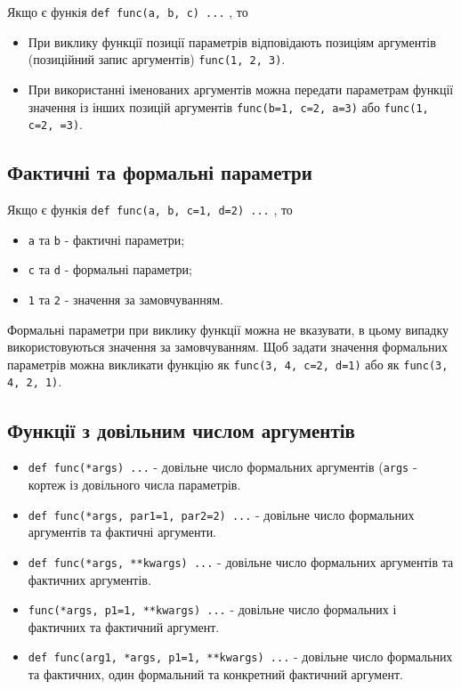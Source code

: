 \begin{frame}
Якщо є функія \texttt{def func(a, b, c) ...} , то

\begin{itemize}
  \item При виклику функції позиції параметрів відповідають позиціям аргументів (позиційний запис аргументів) \texttt{func(1, 2, 3)}.
  \item При використанні іменованих аргументів можна передати параметрам функції значення із інших позицій аргументів \texttt{func(b=1, c=2, a=3)} або \texttt{func(1, c=2, =3)}.
\end{itemize}

\end{frame}

\subsection{Фактичні та формальні параметри} 
\begin{frame}
Якщо є функія \texttt{def func(a, b, c=1, d=2) ...} , то
\begin{itemize}
  \item \texttt{a} та \texttt{b} - фактичні параметри;
  \item \texttt{c} та \texttt{d} - формальні параметри;
  \item \texttt{1}  та \texttt{2} - значення за замовчуванням. 
\end{itemize}

Формальні параметри при виклику функції можна не вказувати, в цьому випадку використовуються значення за замовчуванням. Щоб задати значення формальних параметрів можна викликати функцію як \texttt{func(3, 4, c=2, d=1)} або як \texttt{func(3, 4, 2, 1)}.


\end{frame}

\subsection{Функції з довільним числом аргументів} 
\begin{frame}
\begin{itemize}
  \item \texttt{def func(*args) ...} - довільне число формальних аргументів (\texttt{args} - кортеж із довільного числа параметрів. 
  \item \texttt{def func(*args, par1=1, par2=2) ...}  - довільне число формальних аргументів та фактичні аргументи.
  \item \texttt{def func(*args, **kwargs) ...} - довільне число формальних аргументів та фактичних аргументів.
  \item \texttt{func(*args, p1=1, **kwargs) ...} - довільне число формальних і фактичних та фактичний аргумент.
   \item \texttt{def func(arg1, *args, p1=1, **kwargs) ...}  - довільне число формальних та фактичних, один формальний та конкретний фактичний аргумент.
\end{itemize}

\end{frame}


